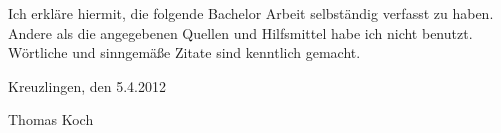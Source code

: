 
\thispagestyle{empty}

Ich erkläre hiermit, die folgende Bachelor Arbeit selbständig verfasst zu
haben. Andere als die angegebenen Quellen und Hilfsmittel habe ich nicht
benutzt. Wörtliche und sinngemäße Zitate sind kenntlich gemacht.

\vspace{0.5cm}
Kreuzlingen, den 5.4.2012
\vspace{1.5cm}

Thomas Koch
